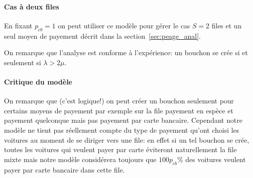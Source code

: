 \documentclass{scrartcl}
\begin{document}
      \paragraph{Cas à deux files}
        En fixant $p_{cb} = 1$ on peut utiliser ce modèle pour gérer le cas
        $S=2$ files et un seul moyen de payement décrit dans la
        section~\ref{sec:peage_anal}.

        On remarque que l'analyse est conforme à l'expérience: un bouchon se
        crée si et seulement si $\lambda > 2\mu$.

      \paragraph{Critique du modèle}
        On remarque que (c'est logique!) on peut créer un bouchon seulement
        pour certains moyens de payement par exemple sur la file payement en
        espèce et payement quelconque mais pas payement par carte bancaire.
        Cependant notre modèle ne tient pas réellement compte du type de
        payement qu'ont choisi les voitures au moment de se diriger vers une
        file: en effet si un tel bouchon se crée, toutes les voitures qui
        veulent payer par carte éviteront naturellement la file mixte mais
        notre modèle considérera toujours que $100 p_{cb}\%$ des voitures
        veulent payer par carte bancaire dans cette file.
\end{document}
